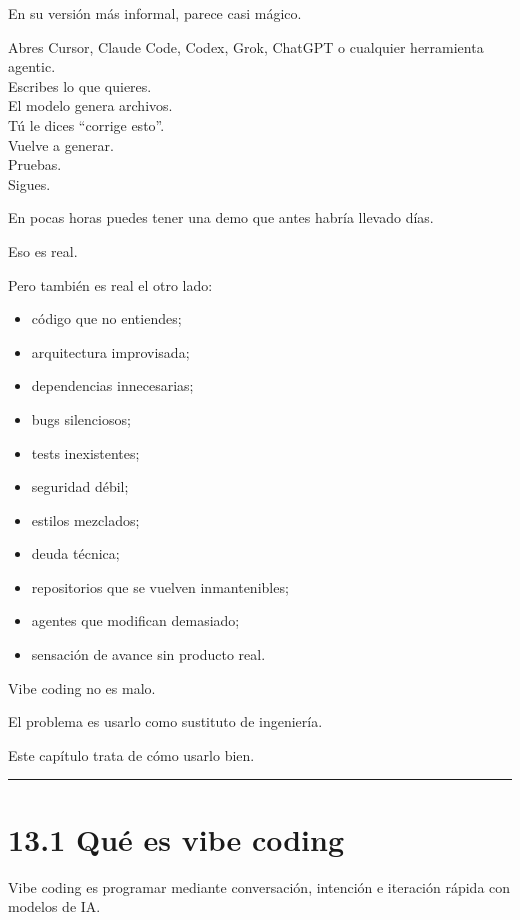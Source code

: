 En su versión más informal, parece casi mágico.

Abres Cursor, Claude Code, Codex, Grok, ChatGPT o cualquier herramienta
agentic.\\
Escribes lo que quieres.\\
El modelo genera archivos.\\
Tú le dices ``corrige esto''.\\
Vuelve a generar.\\
Pruebas.\\
Sigues.

En pocas horas puedes tener una demo que antes habría llevado días.

Eso es real.

Pero también es real el otro lado:

\begin{itemize}
\tightlist
\item
  código que no entiendes;
\item
  arquitectura improvisada;
\item
  dependencias innecesarias;
\item
  bugs silenciosos;
\item
  tests inexistentes;
\item
  seguridad débil;
\item
  estilos mezclados;
\item
  deuda técnica;
\item
  repositorios que se vuelven inmantenibles;
\item
  agentes que modifican demasiado;
\item
  sensación de avance sin producto real.
\end{itemize}

Vibe coding no es malo.

El problema es usarlo como sustituto de ingeniería.

Este capítulo trata de cómo usarlo bien.

\begin{center}\rule{0.5\linewidth}{0.5pt}\end{center}

\section{13.1 Qué es vibe coding}\label{quuxe9-es-vibe-coding}

Vibe coding es programar mediante conversación, intención e iteración
rápida con modelos de IA.

